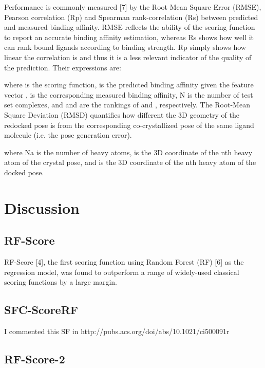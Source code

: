 \documentclass{llncs}
\begin{document}

Performance is commonly measured [7] by the Root Mean Square Error (RMSE), Pearson correlation (Rp) and Spearman rank-correlation (Rs) between predicted and measured binding affinity. RMSE reflects the ability of the scoring function to report an accurate binding affinity estimation, whereas Rs shows how well it can rank bound ligands according to binding strength. Rp simply shows how linear the correlation is and thus it is a less relevant indicator of the quality of the prediction. Their expressions are:


where  is the scoring function,  is the predicted binding affinity given the feature vector ,  is the corresponding measured binding affinity, N is the number of test set complexes, and  and  are the rankings of  and , respectively. 
The Root-Mean Square Deviation (RMSD) quantifies how different the 3D geometry of the redocked pose is from the corresponding co-crystallized pose of the same ligand molecule (i.e. the pose generation error). 

where Na is the number of heavy atoms,  is the 3D coordinate of the nth heavy atom of the crystal pose, and  is the 3D coordinate of the nth heavy atom of the docked pose.

\section{Discussion}

\subsection{RF-Score}

RF-Score [4], the first scoring function using Random Forest (RF) [6] as the regression model, was found to outperform a range of widely-used classical scoring functions by a large margin.

\subsection{SFC-ScoreRF}

I commented this SF in http://pubs.acs.org/doi/abs/10.1021/ci500091r

\subsection{RF-Score-2}
\end{document}
